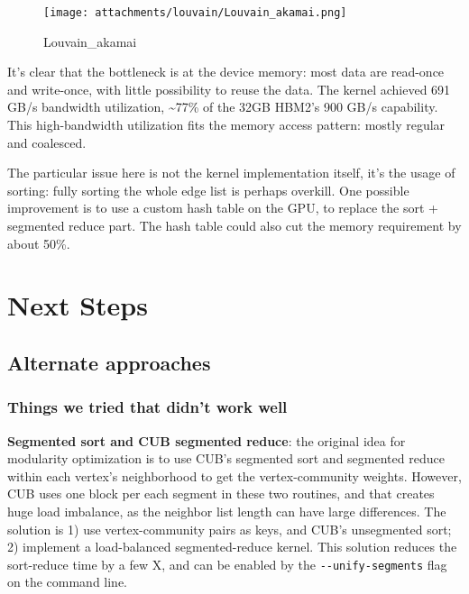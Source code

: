 \documentclass[10pt,oneside]{memoir}
\begin{document}
\begin{figure}
\centering
\texttt{[image: attachments/louvain/Louvain\_akamai.png]}
\caption{Louvain\_akamai}
\end{figure}

It's clear that the bottleneck is at the device memory: most data are
read-once and write-once, with little possibility to reuse the data. The
kernel achieved 691 GB/s bandwidth utilization, \textasciitilde{}77\% of
the 32GB HBM2's 900 GB/s capability. This high-bandwidth utilization
fits the memory access pattern: mostly regular and coalesced.

The particular issue here is not the kernel implementation itself, it's
the usage of sorting: fully sorting the whole edge list is perhaps
overkill. One possible improvement is to use a custom hash table on the
GPU, to replace the sort + segmented reduce part. The hash table could
also cut the memory requirement by about 50\%.

\hypertarget{next-steps-4}{%
\section{Next Steps}\label{next-steps-4}}

\hypertarget{alternate-approaches-3}{%
\subsection{Alternate approaches}\label{alternate-approaches-3}}

\hypertarget{things-we-tried-that-didnt-work-well}{%
\subsubsection{Things we tried that didn't work
well}\label{things-we-tried-that-didnt-work-well}}

\textbf{Segmented sort and CUB segmented reduce}: the original idea for
modularity optimization is to use CUB's segmented sort and segmented
reduce within each vertex's neighborhood to get the vertex-community
weights. However, CUB uses one block per each segment in these two
routines, and that creates huge load imbalance, as the neighbor list
length can have large differences. The solution is 1) use
vertex-community pairs as keys, and CUB's unsegmented sort; 2) implement
a load-balanced segmented-reduce kernel. This solution reduces the
sort-reduce time by a few X, and can be enabled by the
\texttt{-\/-unify-segments} flag on the command line.
\end{document}
